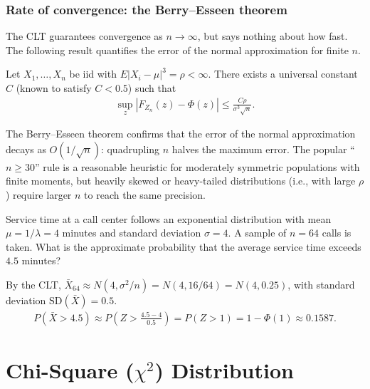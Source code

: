 \subsubsection{Rate of convergence: the Berry--Esseen theorem}

The CLT guarantees convergence as $n \to \infty$, but says nothing about how fast. The following result quantifies the error of the normal approximation for finite $n$.

\begin{teorema}
 \label{eq:5.2.2}
Let $X_1,\ldots,X_n$ be iid with $E|X_i-\mu|^3 = \rho < \infty$. There exists a universal constant $C$ (known to satisfy $C < 0.5$) such that
\begin{align}
 \sup_z \left|F_{Z_n}(z) - \Phi(z)\right| \le \frac{C\rho}{\sigma^3\sqrt{n}}.
\end{align}
\end{teorema}

\begin{observacion}
The Berry--Esseen theorem confirms that the error of the normal approximation decays as $O(1/\sqrt{n})$: quadrupling $n$ halves the maximum error. The popular ``$n \ge 30$'' rule is a reasonable heuristic for moderately symmetric populations with finite moments, but heavily skewed or heavy-tailed distributions (i.e., with large $\rho$) require larger $n$ to reach the same precision.
\end{observacion}

\begin{ejemplo}
 \label{exmp:5.2.1}
Service time at a call center follows an exponential distribution with mean $\mu = 1/\lambda = 4$ minutes and standard deviation $\sigma = 4$. A sample of $n=64$ calls is taken. What is the approximate probability that the average service time exceeds $4.5$ minutes?
\end{ejemplo}

\begin{solucion}
By the CLT, $\bar{X}_{64} \approx N(4, \sigma^2/n) = N(4, 16/64) = N(4, 0.25)$, with standard deviation $\text{SD}(\bar{X}) = 0.5$.
\begin{align}
 P(\bar{X} > 4.5) \approx P\!\left(Z > \frac{4.5-4}{0.5}\right) = P(Z>1) = 1-\Phi(1)
 \approx 0.1587.
\end{align}
\end{solucion}



\section{Chi-Square ($\chi^2$) Distribution}


